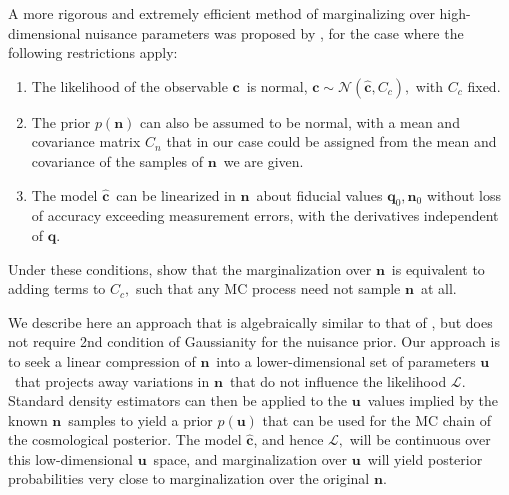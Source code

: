 \documentclass[linenumbers, onecolumn]{aastex63}
\newcommand{\vecc}{\ensuremath{\mathbf{c}}}
\newcommand{\vecq}{\ensuremath{\mathbf{q}}}
\newcommand{\vecn}{\ensuremath{\mathbf{n}}}
\newcommand{\vecu}{\ensuremath{\mathbf{u}}}
\newcommand{\hatc}{\ensuremath{\hat{\mathbf{c}}}}
\newcommand{\covm}{C}
\newcommand{\likeli}{\mathcal{L}}
\begin{document}
A more rigorous and extremely efficient method of marginalizing over high-dimensional nuisance parameters was proposed by \citet{hans}, for the case where the following restrictions apply:
\begin{enumerate}
\item The likelihood of the observable \vecc\ is normal, $\vecc \sim \mathcal{N}( \hatc, \covm_c),$ with $\covm_c$ fixed.
\item The prior $p(\vecn)$ can also be assumed to be normal, with a mean and covariance matrix $\covm_n$ that in our case could be assigned from the mean and covariance of the samples of \vecn\ we are given.
\item The model \hatc\ can be linearized in \vecn\ about fiducial values $\vecq_0, \vecn_0$ without loss of accuracy exceeding measurement errors, with the derivatives independent of \vecq.
\end{enumerate}
Under these conditions, \citet{hans} show that the marginalization over \vecn\ is equivalent to adding terms to $\covm_c,$ such that any MC process need not sample \vecn\ at all.

We describe here an approach that is algebraically similar to that of \citet{hans}, but does not require 2nd condition of Gaussianity for the nuisance prior.  Our approach is to seek a linear compression of \vecn\ into a lower-dimensional set of parameters \vecu\ that projects away variations in \vecn\ that do not influence the likelihood $\likeli.$  Standard density estimators can then be applied to the \vecu\ values implied by the known \vecn\ samples to yield a prior $p(\vecu)$ that can be used for the MC chain of the cosmological posterior.  The model \hatc, and hence $\likeli,$ will be continuous over this low-dimensional \vecu\ space, and marginalization over \vecu\ will yield posterior probabilities very close to marginalization over the original \vecn.  
\end{document}
